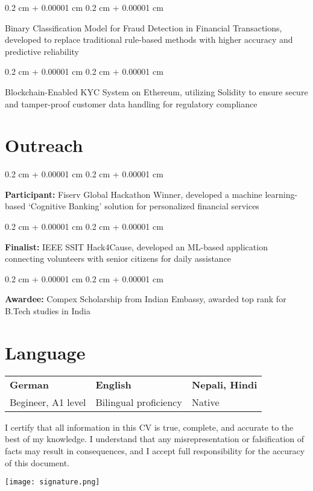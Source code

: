 \documentclass[10pt, letterpaper]{article}
\newenvironment{onecolentry}{
    \begin{adjustwidth}{
        0.2 cm + 0.00001 cm
    }{
        0.2 cm + 0.00001 cm
    }
}{
    \end{adjustwidth}
} %
\begin{document}
\vspace{0.2 cm}

\begin{onecolentry}
    Binary Classification Model for Fraud Detection in Financial Transactions, developed to replace traditional rule-based methods with higher accuracy and predictive reliability
\end{onecolentry}

\vspace{0.2 cm}

\begin{onecolentry}
    Blockchain-Enabled KYC System on Ethereum, utilizing Solidity to ensure secure and tamper-proof customer data handling for regulatory compliance
\end{onecolentry}



\section{Outreach}

\begin{onecolentry}
    \textbf{Participant:} Fiserv Global Hackathon Winner, developed a machine learning-based ‘Cognitive Banking’ solution for personalized financial services
\end{onecolentry}

\vspace{0.2 cm}

\begin{onecolentry}
    \textbf{Finalist:} IEEE SSIT Hack4Cause, developed an ML-based application connecting volunteers with senior citizens for daily assistance
\end{onecolentry}

\vspace{0.2 cm}

\begin{onecolentry}
    \textbf{Awardee:} Compex Scholarship from Indian Embassy, awarded top rank for B.Tech studies in India
\end{onecolentry}



    \section{Language}

    
        \begin{tabularx}{\textwidth}{X X X}
            \textbf{German} & \textbf{English} & \textbf{Nepali, Hindi} \\
            Begineer, A1 level & Bilingual proficiency & Native \\
        \end{tabularx}

    \vspace{0.5 cm}
    
    I certify that all information in this CV is true, complete, and accurate to the best of my knowledge. I understand that any misrepresentation or falsification of facts may result in consequences, and I accept full responsibility for the accuracy of this document.

    \hfill
    \texttt{[image: signature.png]} %
\end{document}
